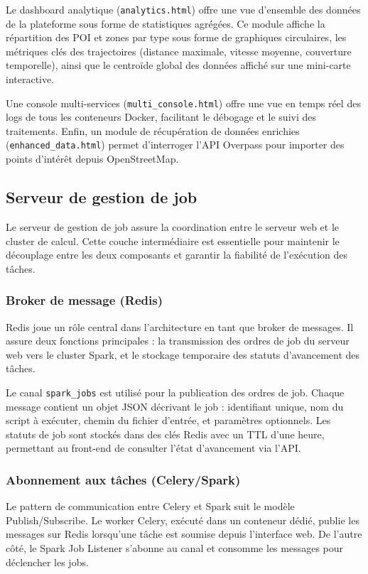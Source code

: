 \documentclass[french]{tai_info} %
\begin{document}
Le dashboard analytique (\texttt{analytics.html}) offre une vue d'ensemble des données de la plateforme sous forme de statistiques agrégées. Ce module affiche la répartition des POI et zones par type sous forme de graphiques circulaires, les métriques clés des trajectoires (distance maximale, vitesse moyenne, couverture temporelle), ainsi que le centroïde global des données affiché sur une mini-carte interactive.

Une console multi-services (\texttt{multi\_console.html}) offre une vue en temps réel des logs de tous les conteneurs Docker, facilitant le débogage et le suivi des traitements. Enfin, un module de récupération de données enrichies (\texttt{enhanced\_data.html}) permet d'interroger l'API Overpass pour importer des points d'intérêt depuis OpenStreetMap.

\subsection{Serveur de gestion de job}

Le serveur de gestion de job assure la coordination entre le serveur web et le cluster de calcul. Cette couche intermédiaire est essentielle pour maintenir le découplage entre les deux composants et garantir la fiabilité de l'exécution des tâches.

\subsubsection{Broker de message (Redis)}

Redis joue un rôle central dans l'architecture en tant que broker de messages. Il assure deux fonctions principales : la transmission des ordres de job du serveur web vers le cluster Spark, et le stockage temporaire des statuts d'avancement des tâches.

Le canal \texttt{spark\_jobs} est utilisé pour la publication des ordres de job. Chaque message contient un objet JSON décrivant le job : identifiant unique, nom du script à exécuter, chemin du fichier d'entrée, et paramètres optionnels. Les statuts de job sont stockés dans des clés Redis avec un TTL d'une heure, permettant au front-end de consulter l'état d'avancement via l'API.

\subsubsection{Abonnement aux tâches (Celery/Spark)}

Le pattern de communication entre Celery et Spark suit le modèle Publish/Subscribe. Le worker Celery, exécuté dans un conteneur dédié, publie les messages sur Redis lorsqu'une tâche est soumise depuis l'interface web. De l'autre côté, le Spark Job Listener s'abonne au canal et consomme les messages pour déclencher les jobs.
\end{document}
